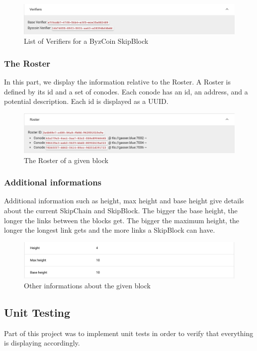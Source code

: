 \documentclass[11pt, a4paper, twoside, openright]{article} %
\begin{document}
{\begin{figure}[h]
    \includegraphics[width=\textwidth]{Verifiers.png}
    \caption{List of Verifiers for a ByzCoin SkipBlock}
\end{figure}
\subsubsection{The Roster}

In this part, we display the information relative to the Roster. A Roster is defined by its id and a set of conodes. Each conode has an id, an address, and a potential description. Each id is displayed as a UUID.
\begin{figure}[h]
    \includegraphics[width=\textwidth]{Roster.png}
    \caption{The Roster of a given block}
\end{figure}
\newpage
\subsubsection{Additional informations}

Additional information such as height, max height and base height give details about the current SkipChain and SkipBlock.
The bigger the base height, the longer the links between the blocks get. The bigger the maximum height, the longer the longest link gets and the more links a SkipBlock can have.
\begin{figure}[h]
    \includegraphics[width=\textwidth]{Additional.png}
    \caption{Other informations about the given block}
\end{figure}
\subsection{Unit Testing}
Part of this project was to implement unit tests in order to verify that everything is displaying accordingly.

}
\end{document}
